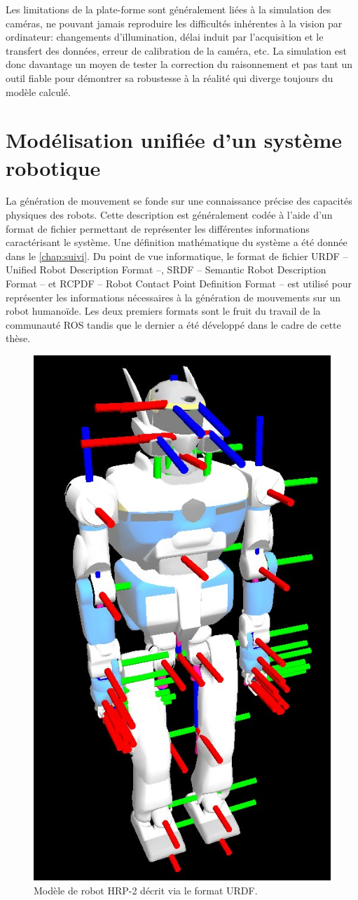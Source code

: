 Les limitations de la plate-forme sont généralement liées à la
simulation des caméras, ne pouvant jamais reproduire les difficultés
inhérentes à la vision par ordinateur: changements d'illumination,
délai induit par l'acquisition et le transfert des données, erreur de
calibration de la caméra, etc. La simulation est donc davantage un
moyen de tester la correction du raisonnement et pas tant un outil
fiable pour démontrer sa robustesse à la réalité qui diverge toujours
du modèle calculé.


\section{Modélisation unifiée d'un système robotique}


La génération de mouvement se fonde sur une connaissance précise des
capacités physiques des robots. Cette description est généralement
codée à l'aide d'un format de fichier permettant de représenter les
différentes informations caractérisant le système. Une définition
mathématique du système a été donnée dans le \autoref{chap:suivi}. Du
point de vue informatique, le format de fichier URDF -- Unified Robot
Description Format --,
SRDF -- Semantic Robot Description Format -- et RCPDF -- Robot Contact Point
Definition Format -- est utilisé pour représenter les informations nécessaires à
la génération de mouvements sur un robot humanoïde. Les deux premiers
formats sont le fruit du travail de la communauté ROS tandis que le
dernier a été développé dans le cadre de cette thèse.

\begin{figure}
  \begin{center}
    \includegraphics[width=.45\linewidth]{src/chap4-integration/hrp2_urdf.jpg}
  \end{center}
  \caption{Modèle de robot HRP-2 décrit via le format URDF.}
\end{figure}



